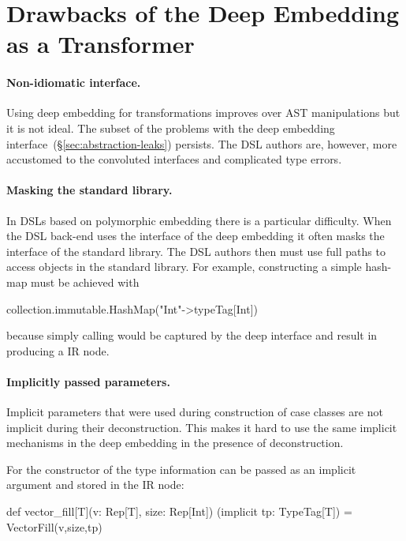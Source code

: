 \section{Drawbacks of the Deep Embedding as a Transformer}
\label{sec:drawbacks-of-the-deep-embedding-as-a-transformer}

\paragraph{Non-idiomatic interface.} Using deep embedding for transformations improves over
AST manipulations but it is not ideal. The subset of the problems with the deep embedding
 interface~(\S \ref{sec:abstraction-leaks}) persists. The DSL authors are, however, more
 accustomed to the convoluted interfaces and complicated type errors.

\paragraph{Masking the standard library.} In DSLs based on polymorphic embedding there
 is a particular difficulty. When the DSL back-end uses the interface of the deep embedding
 it often masks the interface of the standard library. The DSL authors then must use full
 paths to access objects in the standard library. For example, constructing a simple hash-map
 must be achieved with \begin{lstparagraph}
collection.immutable.HashMap("Int"->typeTag[Int])
\end{lstparagraph}
because simply calling  would be captured by the deep interface
and result in producing a  IR node.

\paragraph{Implicitly passed parameters.} Implicit parameters that were used during construction
of case classes are not implicit during their deconstruction. This makes it hard to use the same implicit
mechanisms in the deep embedding in the presence of deconstruction.

For the constructor of  the type information can be passed as an implicit argument
and stored in the IR node:\begin{lstparagraph}
def vector_fill[T](v: Rep[T], size: Rep[Int])
  (implicit tp: TypeTag[T]) = VectorFill(v,size,tp)
\end{lstparagraph}

